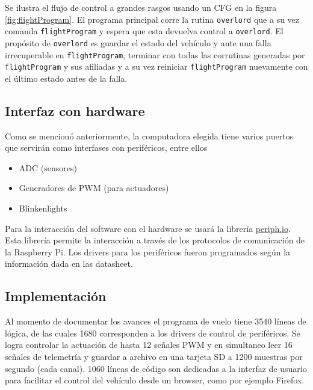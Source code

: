 Se ilustra el flujo de control a grandes rasgos usando un CFG en la figura \ref{fig:flightProgram}. El programa principal corre la rutina \texttt{overlord} que a su vez comanda \texttt{flightProgram} y espera que esta devuelva control a \texttt{overlord}. El propósito de \texttt{overlord} es guardar el estado del vehículo y ante una falla irrecuperable en \texttt{flightProgram}, terminar con todas las corrutinas generadas por \texttt{flightProgram} y sus afiliadas y a su vez reiniciar \texttt{flightProgram} nuevamente con el último estado antes de la falla.


\subsection{Interfaz con hardware}

Como se mencionó anteriormente, la computadora elegida tiene varios puertos que servirán como interfases con periféricos, entre ellos 

\begin{itemize}
    \item ADC (sensores)
    \item Generadores de PWM (para actuadores)
    \item Blinkenlights
\end{itemize}

Para la interacción del software con el hardware se usará la librería \href{https://periph.io}{periph.io}. Esta librería permite la interacción a través de los protocolos de comunicación de la Raspberry Pi. Los drivers para los periféricos fueron programados según la información dada en las datasheet.


\subsection{Implementación}

Al momento de documentar los avances el programa de vuelo tiene 3540 líneas de lógica, de las cuales 1680 corresponden a los drivers de control de periféricos. Se logra controlar la actuación de hasta 12 señales PWM y en simultaneo leer 16 señales de telemetría y guardar a archivo en una tarjeta SD a 1200 muestras por segundo (cada canal). 1060 líneas de código son dedicadas a la interfaz de usuario para facilitar el control del vehículo desde un browser, como por ejemplo Firefox.



